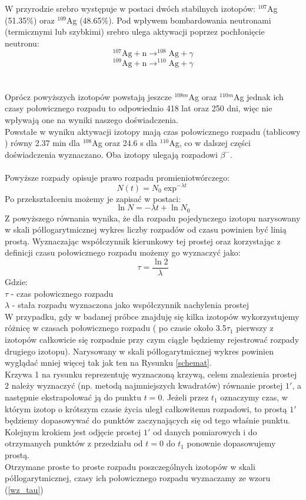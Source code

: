 \documentclass{article}
\begin{document}
W przyrodzie srebro występuje w postaci dwóch stabilnych izotopów: $^{107}$Ag (51.35\%) oraz $^{109}$Ag (48.65\%). Pod wpływem bombardowania neutronami (termicznymi lub szybkimi) srebro ulega aktywacji poprzez pochłonięcie neutronu:\\
\[^{107}\text{Ag} + \text{n} \to ^{108}\text{Ag} + \gamma
\]
\[^{109}\text{Ag} + \text{n} \to ^{110}\text{Ag} + \gamma
\]\\\\
Oprócz powyższych izotopów powstają jeszcze $^{108m}$Ag oraz $^{110m}$Ag jednak ich czasy połowicznego rozpadu to odpowiednio 418 lat oraz 250 dni, więc nie wpływają one na wyniki naszego doświadczenia.\\
Powstałe w wyniku aktywacji izotopy mają czas połowicznego rozpadu (tablicowy \cite{1}) równy 2.37 min dla $^{108}$Ag oraz 24.6 s dla $^{110}$Ag, co w dalszej części doświadczenia wyznaczano. Oba izotopy ulegają rozpadowi $\beta ^-$. \\\\
Powyższe rozpady opisuje prawo rozpadu promieniotwórczego:
\begin{equation}
N(t) = N_0 \exp^{-\lambda t}
\end{equation}
Po przekształceniu możemy je zapisać w postaci:
\begin{equation}
\ln N = -\lambda t + \ln N_0
\label{wz_rozpad_log}
\end{equation}
Z powyższego równania wynika, że dla rozpadu pojedynczego izotopu narysowany w skali półlogarytmicznej wykres liczby rozpadów od czasu powinien być linią prostą. Wyznaczając współczynnik kierunkowy tej prostej oraz korzystając z definicji czasu połowicznego rozpadu możemy go wyznaczyć jako:
\begin{equation}
\tau = \frac{\ln 2}{\lambda}
\label{wz_tau}
\end{equation}
Gdzie:\\
$\tau$ - czas połowicznego rozpadu\\
$\lambda $ - stała rozpadu wyznaczona jako współczynnik nachylenia prostej\\

W przypadku, gdy w badanej próbce znajduję się kilka izotopów wykorzystujemy różnicę w czasach połowicznego rozpadu ( po czasie około 3.5$\tau _1$ pierwszy z izotopów całkowicie się rozpadnie przy czym ciągle będziemy rejestrować rozpady drugiego izotopu). Narysowany w skali półlogarytmicznej wykres powinien wyglądać mniej więcej tak jak ten na Rysunku \ref{schemat}. \\
Krzywa 1 na rysunku reprezentuję wyznaczoną krzywą, celem znalezienia prostej $2$ należy wyznaczyć (np. metodą najmniejszych kwadratów) równanie prostej $1'$, a następnie ekstrapolować ją do punktu $t=0$. Jeżeli przez $t_1$ oznaczymy czas, w którym izotop o krótszym czasie życia uległ całkowitemu rozpadowi, to prostą $1'$ będziemy dopasowywać do punktów zaczynających się od tego właśnie punktu. Kolejnym krokiem jest odjęcie prostej $1'$ od danych pomiarowych i do otrzymanych punktów z przedziału od $t=0$ do $t_1$ ponownie dopasowujemy prostą.\\
Otrzymane proste to proste rozpadu poszczególnych izotopów w skali półlogarytmicznej, czasy ich połowicznego rozpadu wyznaczamy ze wzoru (\ref{wz_tau})
\end{document}
